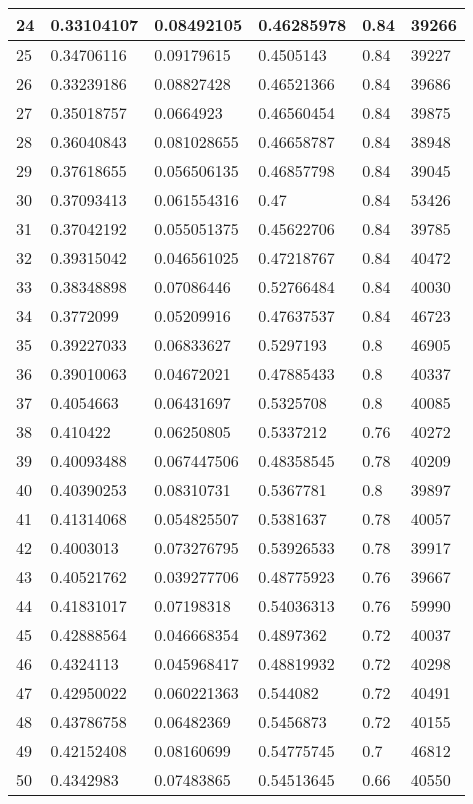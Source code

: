 \begin{longtable}{|l|l|l|l|l|l|}
24 & 0.33104107 & 0.08492105 & 0.46285978 & 0.84 & 39266 \\ \hline 
25 & 0.34706116 & 0.09179615 & 0.4505143 & 0.84 & 39227 \\ \hline 
26 & 0.33239186 & 0.08827428 & 0.46521366 & 0.84 & 39686 \\ \hline 
27 & 0.35018757 & 0.0664923 & 0.46560454 & 0.84 & 39875 \\ \hline 
28 & 0.36040843 & 0.081028655 & 0.46658787 & 0.84 & 38948 \\ \hline 
29 & 0.37618655 & 0.056506135 & 0.46857798 & 0.84 & 39045 \\ \hline 
30 & 0.37093413 & 0.061554316 & 0.47 & 0.84 & 53426 \\ \hline 
31 & 0.37042192 & 0.055051375 & 0.45622706 & 0.84 & 39785 \\ \hline 
32 & 0.39315042 & 0.046561025 & 0.47218767 & 0.84 & 40472 \\ \hline 
33 & 0.38348898 & 0.07086446 & 0.52766484 & 0.84 & 40030 \\ \hline 
34 & 0.3772099 & 0.05209916 & 0.47637537 & 0.84 & 46723 \\ \hline 
35 & 0.39227033 & 0.06833627 & 0.5297193 & 0.8 & 46905 \\ \hline 
36 & 0.39010063 & 0.04672021 & 0.47885433 & 0.8 & 40337 \\ \hline 
37 & 0.4054663 & 0.06431697 & 0.5325708 & 0.8 & 40085 \\ \hline 
38 & 0.410422 & 0.06250805 & 0.5337212 & 0.76 & 40272 \\ \hline 
39 & 0.40093488 & 0.067447506 & 0.48358545 & 0.78 & 40209 \\ \hline 
40 & 0.40390253 & 0.08310731 & 0.5367781 & 0.8 & 39897 \\ \hline 
41 & 0.41314068 & 0.054825507 & 0.5381637 & 0.78 & 40057 \\ \hline 
42 & 0.4003013 & 0.073276795 & 0.53926533 & 0.78 & 39917 \\ \hline 
43 & 0.40521762 & 0.039277706 & 0.48775923 & 0.76 & 39667 \\ \hline 
44 & 0.41831017 & 0.07198318 & 0.54036313 & 0.76 & 59990 \\ \hline 
45 & 0.42888564 & 0.046668354 & 0.4897362 & 0.72 & 40037 \\ \hline 
46 & 0.4324113 & 0.045968417 & 0.48819932 & 0.72 & 40298 \\ \hline 
47 & 0.42950022 & 0.060221363 & 0.544082 & 0.72 & 40491 \\ \hline 
48 & 0.43786758 & 0.06482369 & 0.5456873 & 0.72 & 40155 \\ \hline 
49 & 0.42152408 & 0.08160699 & 0.54775745 & 0.7 & 46812 \\ \hline 
50 & 0.4342983 & 0.07483865 & 0.54513645 & 0.66 & 40550 \\ \hline 
\end{longtable}
